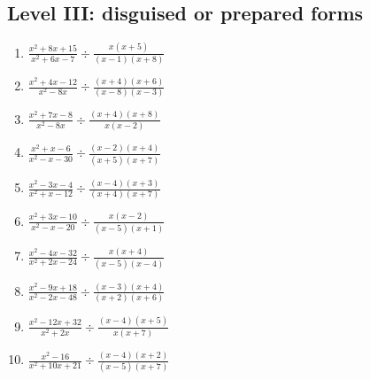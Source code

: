 \documentclass[11pt,oneside]{book}
\begin{document}
\subsection*{Level III: disguised or prepared forms}
\begin{enumerate}[leftmargin=*,label=\textbf{\arabic*.},itemsep=0.65\baselineskip]
\item $\displaystyle \frac{x^{2} + 8 x + 15}{x^{2} + 6 x - 7}\div\frac{x \left(x + 5\right)}{\left(x - 1\right) \left(x + 8\right)}$
\item $\displaystyle \frac{x^{2} + 4 x - 12}{x^{2} - 8 x}\div\frac{\left(x + 4\right) \left(x + 6\right)}{\left(x - 8\right) \left(x - 3\right)}$
\item $\displaystyle \frac{x^{2} + 7 x - 8}{x^{2} - 8 x}\div\frac{\left(x + 4\right) \left(x + 8\right)}{x \left(x - 2\right)}$
\item $\displaystyle \frac{x^{2} + x - 6}{x^{2} - x - 30}\div\frac{\left(x - 2\right) \left(x + 4\right)}{\left(x + 5\right) \left(x + 7\right)}$
\item $\displaystyle \frac{x^{2} - 3 x - 4}{x^{2} + x - 12}\div\frac{\left(x - 4\right) \left(x + 3\right)}{\left(x + 4\right) \left(x + 7\right)}$
\item $\displaystyle \frac{x^{2} + 3 x - 10}{x^{2} - x - 20}\div\frac{x \left(x - 2\right)}{\left(x - 5\right) \left(x + 1\right)}$
\item $\displaystyle \frac{x^{2} - 4 x - 32}{x^{2} + 2 x - 24}\div\frac{x \left(x + 4\right)}{\left(x - 5\right) \left(x - 4\right)}$
\item $\displaystyle \frac{x^{2} - 9 x + 18}{x^{2} - 2 x - 48}\div\frac{\left(x - 3\right) \left(x + 4\right)}{\left(x + 2\right) \left(x + 6\right)}$
\item $\displaystyle \frac{x^{2} - 12 x + 32}{x^{2} + 2 x}\div\frac{\left(x - 4\right) \left(x + 5\right)}{x \left(x + 7\right)}$
\item $\displaystyle \frac{x^{2} - 16}{x^{2} + 10 x + 21}\div\frac{\left(x - 4\right) \left(x + 2\right)}{\left(x - 5\right) \left(x + 7\right)}$
\end{enumerate}
\end{document}
